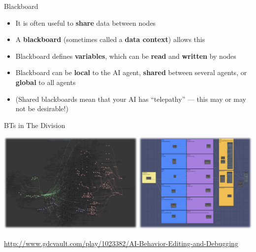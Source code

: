 \begin{frame}{Blackboard}
	\begin{itemize}
		\pause\item It is often useful to \textbf{share} data between nodes
		\pause\item A \textbf{blackboard} (sometimes called a \textbf{data context}) allows this
		\pause\item Blackboard defines \textbf{variables}, which can be \textbf{read} and \textbf{written} by nodes
		\pause\item Blackboard can be \textbf{local} to the AI agent, \textbf{shared} between several agents, or \textbf{global} to all agents
		\pause\item (Shared blackboards mean that your AI has ``telepathy'' --- this may or may not be desirable!)
	\end{itemize}
\end{frame}

\begin{frame}{BTs in The Division}
	\begin{center}
		\includegraphics[width=\textwidth]{the_division}
		
		\url{http://www.gdcvault.com/play/1023382/AI-Behavior-Editing-and-Debugging}
	\end{center}
\end{frame}
